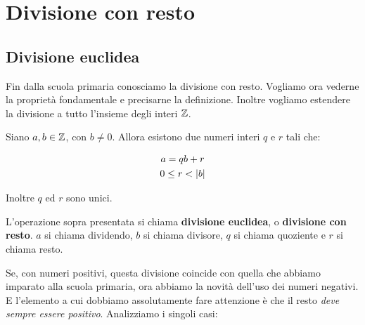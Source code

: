 \chapter{Divisione con resto}

\section{Divisione euclidea}

Fin dalla scuola primaria conosciamo la divisione con resto. Vogliamo ora vederne la proprietà fondamentale e precisarne la definizione. Inoltre vogliamo estendere la divisione a tutto l'insieme degli interi $ \mathbb{Z} $.

\begin{mdframed}
\begin{teorema}
Siano $a, b \in  \mathbb{Z} $, con $b \ne 0$. Allora esistono due numeri interi $q$ e $r$ tali che:

\begin{gather}
    a = qb + r \\
    0 \le r <  \lvert b \rvert 
\end{gather}

Inoltre $q$ ed $r$ sono unici.
\end{teorema}
\end{mdframed}

\begin{mdframed}
\begin{definizione}
L'operazione sopra presentata si chiama \textbf{divisione euclidea}, o \textbf{divisione con resto}. $a$
si chiama dividendo, $b$ si chiama divisore, $q$ si chiama quoziente e $r$ si chiama resto.
\end{definizione}
\end{mdframed}

Se, con numeri positivi, questa divisione coincide con quella che abbiamo imparato alla scuola primaria, ora abbiamo la novità dell'uso dei numeri negativi. E l'elemento a cui dobbiamo assolutamente fare attenzione è che il resto \emph{deve sempre essere positivo}. Analizziamo i singoli casi:

